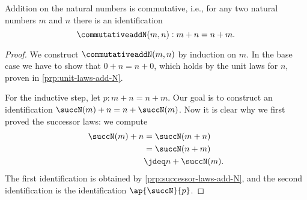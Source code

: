 \begin{prp}
  Addition on the natural numbers is commutative, i.e., for any two natural numbers $m$ and $n$ there is an identification
  \begin{equation*}
    \commutativeaddN(m,n) : m+n=n+m.
  \end{equation*}
\end{prp}

\begin{proof}
  We construct $\commutativeaddN(m,n)$ by induction on $m$. In the base case we have to show that $0+n=n+0$, which holds by the unit laws for $n$, proven in \cref{prp:unit-laws-add-N}.

  For the inductive step, let $p:m+n=n+m$. Our goal is to construct an identification $\succN(m)+n=n+\succN(m)$. Now it is clear why we first proved the successor laws: we compute
  \begin{align*}
    \succN(m)+n & = \succN(m+n) \\
                & = \succN(n+m) \\
                & \jdeq n+\succN(m).
  \end{align*}
  The first identification is obtained by \cref{prp:successor-laws-add-N}, and the second identification is the identification $\ap{\succN}{p}$.
\end{proof}

